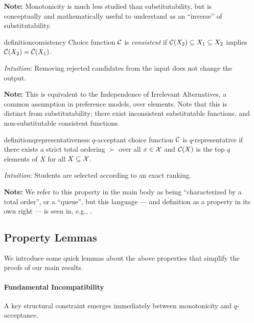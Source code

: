 \textbf{Note:} Monotonicity is much less studied than substitutability, but is conceptually and mathematically useful to understand as an ``inverse'' of substitutability.

\begin{restatable}[Consistency]{definition}{consistency}
\label{def:consistency}
Choice function $\mathcal{C}$ is \textit{consistent} if $\mathcal{C}(X_2) \subseteq X_1 \subseteq X_2$ implies $\mathcal{C}(X_2) = \mathcal{C}(X_1)$.
\end{restatable}
\textit{Intuition}: Removing rejected candidates from the input does not change the output.

\textbf{Note:} This is equivalent to the Independence of Irrelevant Alternatives, a common assumption in preference models, over elements. Note that this is distinct from substitutability; there exist inconsistent substitutable functions, and non-substitutable consistent functions. %

\begin{restatable}[$q$-representativeness]{definition}{qrepresentativeness}
\label{def:q-representative}
$q$-acceptant choice function $\mathcal{C}$ is $q$-representative if there exists a strict total ordering $\succ$ over all $x \in \mathcal{X}$ and $\mathcal{C}(X)$ is the top $q$ elements of $X$ for all $X \subseteq \mathcal{X}$.
\end{restatable}

\textit{Intuition}: Students are selected according to an exact ranking.

\textbf{Note:} We refer to this property in the main body as being ``characterized by a total order'', or a ``queue'', but this language --- and definition as a property in its own right --- is seen in, e.g., \citet{echenique2015control}.

\subsection{Property Lemmas}\label{sec:property-lemmas}

We introduce some quick lemmas about the above properties that simplify the proofs of our main results.

\paragraph{Fundamental Incompatibility}

A key structural constraint emerges immediately between monotonicity and $q$-acceptance.

